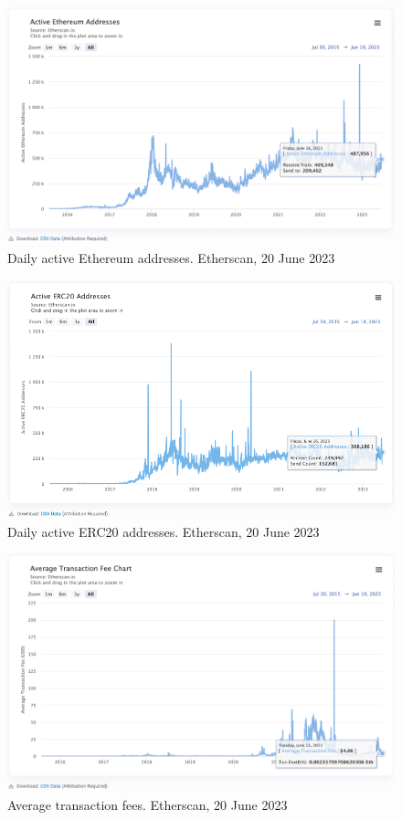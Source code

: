 \documentclass[UTF8]{article}
\begin{document}
\begin{figure}[htbp]
\begin{center}
\includegraphics[width=0.9\linewidth]{images/ethactiv}
\caption{Daily active Ethereum addresses. Etherscan, 20 June 2023}
\label{fig:ethactiv}
\end{center}
\end{figure}

\begin{figure}[htbp]
\begin{center}
\includegraphics[width=0.9\linewidth]{images/ethactiv20}
\caption{Daily active ERC20 addresses. Etherscan, 20 June 2023}
\label{fig:ethactiv20}
\end{center}
\end{figure}

\begin{figure}[htbp]
\begin{center}
\includegraphics[width=0.9\linewidth]{images/ethtxnfee}
\caption{Average transaction fees. Etherscan, 20 June 2023}
\label{fig:ethtxnfee}
\end{center}
\end{figure}
\end{document}
